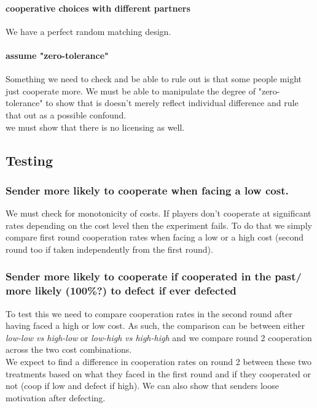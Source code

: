 \documentclass[11pt]{article}
\theoremstyle{plainCl1}
\begin{document}
\paragraph{cooperative choices with different partners}
We have a perfect random matching design. 

\paragraph{assume "zero-tolerance" }
Something we need to check and be able to rule out is that some people might just cooperate more. 
We must be able to manipulate the degree of "zero-tolerance" to show that is doesn't merely reflect individual difference and rule that out as a possible confound. \\
we must show that there is no licensing as well. 

\subsection{Testing}

\subsubsection{Sender more likely to cooperate when facing a low cost.}
We must check for monotonicity of costs. If players don't cooperate at significant rates depending on the cost level then the experiment fails. 
To do that we simply compare first round cooperation rates when facing a low or a high cost (second round too if taken independently from the first round). \\

\subsubsection{Sender more likely to cooperate if cooperated in the past/ \\ more likely (100\%?) to defect if ever defected} 
To test this we need to compare cooperation rates in the second round after having faced a high or low cost. 
As such, the comparison can be between either \textsl{low-low vs high-low} or \textsl{low-high vs high-high} and we compare round 2 cooperation across the two cost combinations. \\ 
We expect to find a difference in cooperation rates on round 2 between these two treatments based on what they faced in the first round and if they cooperated or not (coop if low 			and defect if high). We can also show that senders loose motivation after defecting. \\
\end{document}
